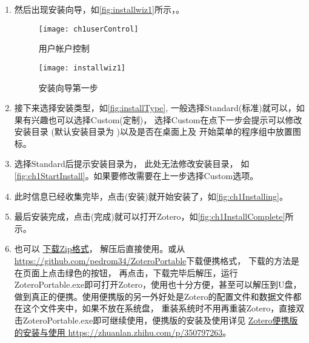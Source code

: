 \documentclass[cn,11pt,chinese]{elegantbook}
\begin{document}
\begin{enumerate}
				\item 然后出现安装向导，如\autoref{fig:installwiz1}所示，。
					\begin{figure}[htbp]
						\centering
						\begin{minipage}[t]{\dimexpr0.5\textwidth-4em}
							\centering
							\texttt{[image: ch1userControl]}
							\caption{用户帐户控制}
							\label{fig:userControl}
						\end{minipage}
						\hspace{1em}		
						\begin{minipage}[t]{\dimexpr0.5\textwidth-4em}
							\centering
							\texttt{[image: installwiz1]}
							\caption{安装向导第一步}
							\label{fig:installwiz1}
						\end{minipage}
					\end{figure}
				\item 接下来选择安装类型，如\autoref{fig:installType},
				一般选择Standard(标准)就可以，如果有兴趣也可以选择Custom(定制)，
				选择Custom在点下一步会提示可以修改安装目录
				(默认安装目录为 )以及是否在桌面上及
				开始菜单的程序组中放置图标。
				\item 选择Standard后提示安装目录为，
				此处无法修改安装目录，
				如\autoref{fig:ch1StartInstall}。如果要修改需要在上一步选择Custom选项。
				\item 此时信息已经收集完毕，点击(安装)就开始安装了，如\autoref{fig:ch1Installing}。
				\item 最后安装完成，点击(完成)就可以打开Zotero，如\autoref{fig:ch1InstallComplete}所示。
				\item 也可以
				\href{https://www.zotero.org/download/client/dl?channel=release&platform=win32-zip}{下载Zip格式}，
				解压后直接使用。或从\href{https://github.com/pedrom34/ZoteroPortable}
				{https://github.com/pedrom34/ZoteroPortable}下载便携格式，
				下载的方法是在页面上点击绿色的按钮，
				再点击，下载完毕后解压，运行ZoteroPortable.exe即可打开Zotero，使用也十分方便，甚至可以解压到U盘，
				做到真正的便携。使用便携版的另一外好处是Zotero的配置文件和数据文件都在这个文件夹中，如果不放在系统盘，
				重装系统时不用再重装Zotero，直接双击ZoteroPortable.exe即可继续使用，便携版的安装及使用详见
				\href{https://zhuanlan.zhihu.com/p/350797263}{Zotero便携版的安装与使用
				\url{https://zhuanlan.zhihu.com/p/350797263}}。


		\end{enumerate}
			
\end{document}

